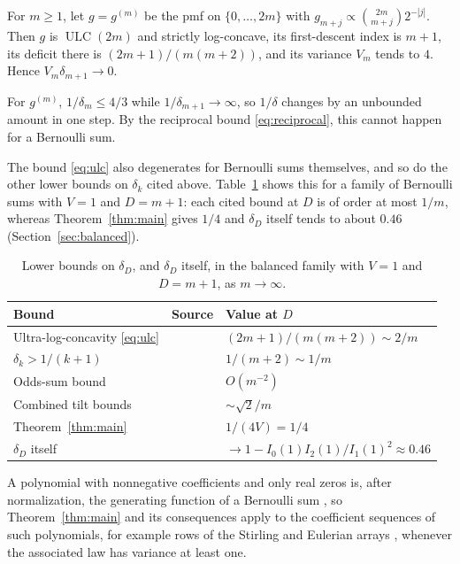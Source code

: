 \documentclass[ECP]{ejpecp}
\begin{document}
\begin{proposition}\label{prop:ulc}
  For $m\geq1$, let $g=g^{(m)}$ be the pmf on $\{0,\ldots,2m\}$ with
  $g_{m+j}\propto\binom{2m}{m+j}2^{-|j|}$. Then $g$ is
  $\operatorname{ULC}(2m)$ and strictly log-concave, its first-descent index
  is $m+1$, its deficit there is $(2m+1)/(m(m+2))$, and its variance $V_m$
  tends to $4$. Hence $V_m\delta_{m+1}\to0$.
\end{proposition}

\begin{remark}\label{rem:ulc-gap}
  For $g^{(m)}$, $1/\delta_m\leq4/3$ while $1/\delta_{m+1}\to\infty$, so
  $1/\delta$ changes by an unbounded amount in one step. By the reciprocal
  bound \eqref{eq:reciprocal}, this cannot happen for a Bernoulli sum.
\end{remark}

The bound \eqref{eq:ulc} also degenerates for Bernoulli sums themselves, and
so do the other lower bounds on $\delta_k$ cited above.
Table~\ref{tab:balanced} shows this for a family of Bernoulli sums with $V=1$
and $D=m+1$: each cited bound at $D$ is of order at most $1/m$, whereas
Theorem~\ref{thm:main} gives $1/4$ and $\delta_D$ itself tends to about
$0.46$ (Section~\ref{sec:balanced}).

\begin{table}[ht]
  \centering
  \caption{Lower bounds on $\delta_D$, and $\delta_D$ itself, in the balanced
  family with $V=1$ and $D=m+1$, as $m\to\infty$.}
  \label{tab:balanced}
  \begin{tabular}{lll}
    \hline
    Bound & Source & Value at $D$\\
    \hline
    Ultra-log-concavity \eqref{eq:ulc} & \cite{hillionjohnson2016} &
      $(2m+1)/(m(m+2))\sim2/m$\\
    $\delta_k>1/(k+1)$ & \cite{duembgenwellner2020} & $1/(m+2)\sim1/m$\\
    Odds-sum bound & \cite{johnson2017discrete} & $O(m^{-2})$\\
    Combined tilt bounds & \cite{pitman1997} & $\sim\sqrt2/m$\\
    Theorem~\ref{thm:main} & & $1/(4V)=1/4$\\
    \hline
    $\delta_D$ itself & & $\to1-I_0(1)I_2(1)/I_1(1)^2\approx0.46$\\
    \hline
  \end{tabular}
\end{table}

A polynomial with nonnegative coefficients and only real zeros is, after
normalization, the generating function of a Bernoulli sum
\cite[Proposition~1]{pitman1997}, so Theorem~\ref{thm:main} and its
consequences apply to the coefficient sequences of such polynomials, for
example rows of the Stirling and Eulerian arrays \cite{branden2015},
whenever the associated law has variance at least one.
\end{document}
